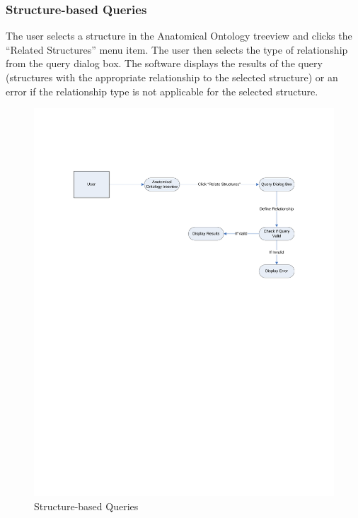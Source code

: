 \documentclass{article}
\begin{document}
\subsubsection{Structure-based Queries}
The user selects a structure in the Anatomical Ontology treeview and clicks the ``Related Structures'' menu item. The user then selects the type of relationship from the query dialog box. The software displays the results of the query (structures with the appropriate relationship to the selected structure) or an error if the relationship type is not applicable for the selected structure.
\begin{figure}[!htb]
\centering
\includegraphics[width=\textwidth]{./diagrams/query-str}
\caption{Structure-based Queries}
\end{figure}
\end{document}
